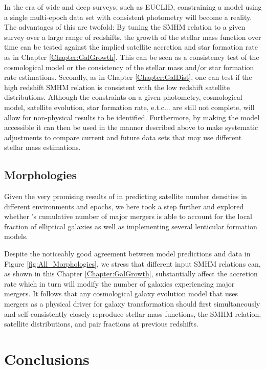 In the era of wide and deep surveys, such as EUCLID, constraining a model using a single multi-epoch data set with consistent photometry will become a reality. The advantages of this are twofold: By tuning the SMHM relation to a given survey over a large range of redshifts, the growth of the stellar mass function over time can be tested against the implied satellite accretion and star formation rate as in Chapter \ref{Chapter:GalGrowth}. This can be seen as a consistency test of the cosmological model or the consistency of the stellar mass and/or star formation rate estimations. Secondly, as in Chapter \ref{Chapter:GalDist}, one can test if the high redshift SMHM relation is consistent with the low redshift satellite distributions. Although the constraints on a given photometry, cosmological model, satellite evolution, star formation rate, e.t.c... are still not complete, \steel will allow for non-physical results to be identified. Furthermore, by making the model accessible it can then be used in the manner described above to make systematic adjustments to compare current and future data sets that may use different stellar mass estimations.

\subsection{Morphologies}

Given the very promising results of \steel in predicting satellite number densities in different environments and epochs, we here took a step further and explored whether \steel's cumulative number of major mergers is able to account for the local fraction of elliptical galaxies as well as implementing several lenticular formation models. 

Despite the noticeably good agreement between model predictions and data in Figure \ref{fig:All_Morphologies}, we stress that different input SMHM relations can, as shown in this Chapter \ref{Chapter:GalGrowth}, substantially affect the accretion rate which in turn will modify the number of galaxies experiencing major mergers. It follows that any cosmological galaxy evolution model that uses mergers as a physical driver for galaxy transformation should first simultaneously and self-consistently closely reproduce stellar mass functions, the SMHM relation, satellite distributions, and pair fractions at previous redshifts.

\section{Conclusions}
\label{sec:Conclusions}


